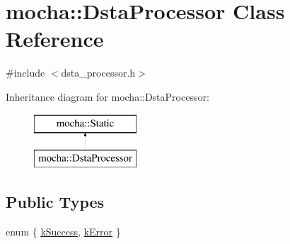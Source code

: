 \hypertarget{classmocha_1_1_dsta_processor}{
\section{mocha::DstaProcessor Class Reference}
\label{classmocha_1_1_dsta_processor}
}


{\ttfamily \#include $<$dsta\_\-processor.h$>$}

Inheritance diagram for mocha::DstaProcessor:\begin{figure}[H]
\begin{center}
\leavevmode
\includegraphics[height=2.000000cm]{classmocha_1_1_dsta_processor}
\end{center}
\end{figure}
\subsection*{Public Types}
\begin{DoxyCompactItemize}
\item 
enum \{ \hyperlink{classmocha_1_1_dsta_processor_a0ecba8d2e7294167a260e88c483dce23af842955727018749f76b8e706b34effa}{kSuccess}, 
\hyperlink{classmocha_1_1_dsta_processor_a0ecba8d2e7294167a260e88c483dce23a5471824fb66c1ace1bee0f9c6ae843ae}{kError}
 \}
\end{DoxyCompactItemize}
